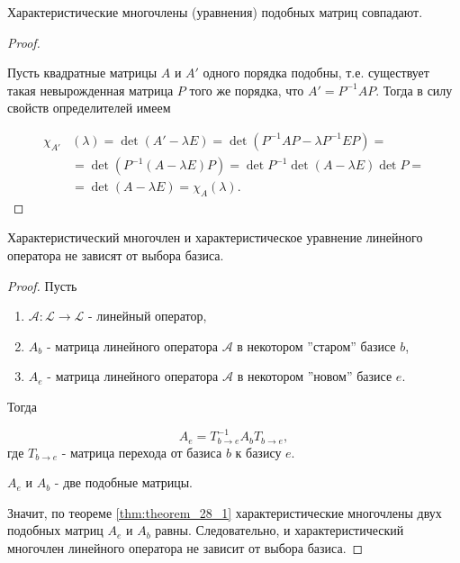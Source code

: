 \begin{theorem}
    Характеристические многочлены (уравнения) подобных матриц совпадают.
    \label{thm:theorem_28_1}
\end{theorem}

\begin{proof}~

    Пусть квадратные матрицы $A$ и $A'$ одного порядка подобны, т.е. существует такая невырожденная матрица $P$ того же порядка, что $A' = P^{-1}AP$. Тогда в силу свойств определителей имеем

    \begin{align*}
        \chi_{A'}&(\lambda) = \det(A' - \lambda E) = \det(P^{-1}AP - \lambda P^{-1}EP) = \\
        &=\det(P^{-1}(A - \lambda E)P) = \det P^{-1}\det(A - \lambda E)\det P = \\
        &=\det(A - \lambda E) = \chi_A(\lambda).
    \end{align*}
\end{proof}

\begin{theorem}
    Характеристический многочлен и характеристическое уравнение линейного оператора не зависят от выбора базиса.
\end{theorem}

\begin{proof} Пусть 

    \begin{enumerate}[nosep]
        \item $\mathscr{A} \colon \mathcal{L} \to \mathcal{L}$ - линейный оператор,
        \item $A_b$ - матрица линейного оператора $\mathscr{A}$ в некотором ''старом'' базисе $b$, 
        \item $A_e$ - матрица линейного оператора $\mathscr{A}$  в некотором ''новом'' базисе $e$.
    \end{enumerate}
    
    Тогда 
    
    $$A_e = T^{-1}_{b \to e}A_bT_{b \to e},$$ где $T_{b \to e}$ - матрица перехода от базиса $b$ к базису $e$.

    $A_e$ и $A_b$ - две подобные матрицы.

    Значит, по теореме \ref{thm:theorem_28_1} характеристические многочлены двух подобных матриц $A_e$ и $A_b$ равны. Следовательно, и характеристический многочлен линейного оператора не зависит от выбора базиса.
\end{proof}
